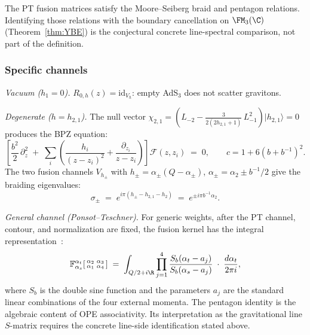 The PT fusion matrices satisfy the Moore--Seiberg braid and pentagon
relations. Identifying those relations with the boundary cancellation
on $\FM_3(\C)$ (Theorem~\ref{thm:YBE}) is the conjectural concrete
line-spectral comparison, not part of the definition.

\subsubsection*{Specific channels}

\emph{Vacuum ($h_1 = 0$).}\enspace
$R_{0,h}(z) = \mathrm{id}_{V_h}$: empty AdS$_3$ does not scatter
gravitons.

\emph{Degenerate ($h = h_{2,1}$).}\enspace
The null vector $\chi_{2,1} = (L_{-2} -
\frac{3}{2(2h_{2,1}+1)}\,L_{-1}^2)|h_{2,1}\rangle = 0$ produces
the BPZ equation:
\begin{equation}\label{eq:bpz-fusion}
\left[
 \frac{b^2}{2}\,\partial_z^2
 \;+\; \sum_{i} \left(
 \frac{h_i}{(z-z_i)^2} + \frac{\partial_{z_i}}{z-z_i}
 \right)
\right]
\mathcal{F}(z, z_i) \;=\; 0,
\qquad c = 1 + 6(b + b^{-1})^2.
\end{equation}
The two fusion channels $V_{h_\pm}$ with
$h_\pm = \alpha_\pm(Q - \alpha_\pm)$,
$\alpha_\pm = \alpha_2 \pm b^{-1}/2$
give the braiding eigenvalues:
\begin{equation}\label{eq:degenerate-eigenvalues}
\sigma_\pm
\;=\;
e^{i\pi(h_\pm - h_{2,1} - h_2)}
\;=\;
e^{\pm i\pi b^{-1}\alpha_2}.
\end{equation}

\emph{General channel (Ponsot--Teschner).}\enspace
For generic weights, after the PT channel, contour, and normalization
are fixed, the fusion kernel has the integral
representation~\cite{PT01}:
\begin{equation}\label{eq:ponsot-teschner}
\mathbb{F}_{\alpha_s}^{\alpha_t}
\!\left[\begin{smallmatrix}
 \alpha_2 & \alpha_3 \\
 \alpha_1 & \alpha_4
\end{smallmatrix}\right]
\;=\;
\int_{Q/2 + i\R}
\prod_{j=1}^{4}
\frac{S_b(\alpha_t - a_j)}{S_b(\alpha_s - a_j)}
\;\cdot\;
\frac{d\alpha_t}{2\pi i},
\end{equation}
where $S_b$ is the double sine function and the parameters $a_j$ are
the standard linear combinations of the four external momenta. The
pentagon identity is the algebraic content of OPE associativity. Its
interpretation as the gravitational line $S$-matrix requires the
concrete line-side identification stated above.

